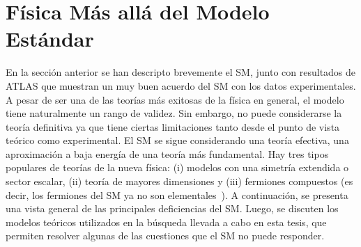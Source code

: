 \section{Física Más allá del Modelo Estándar}
\label{sec:theory:bsm}

En la sección anterior se han descripto brevemente el \ac{SM}, junto con resultados de \ac{ATLAS} que muestran un muy buen acuerdo del \ac{SM} con los datos experimentales. A pesar de ser una de las teorías más exitosas de la física en general, el modelo tiene naturalmente un rango de validez.
Sin embargo, no puede considerarse la teoría definitiva ya que tiene ciertas limitaciones tanto desde el punto de vista teórico como experimental. El \ac{SM} se sigue considerando una teoría efectiva, una aproximación a baja energía de una teoría más fundamental. Hay tres tipos populares de teorías de la nueva física: (i) modelos con una simetría extendida o sector escalar, (ii) teoría de mayores dimensiones y (iii) fermiones compuestos (es decir, los fermiones del \ac{SM} ya no son elementales~\cite{Kuhn_Zherwas-1984,Cabibbo_Maiani_Srivastava-1984,DeRújula_Maiani_Petronzio-1984,Baur_Spira_Zerwas-1990,Bhattacharya_Chauhan_Choudhary_Choudhury-2009,Zhan_Li_Liu_Li-2016}).
A continuación, se presenta una vista general de las principales deficiencias del \ac{SM}. Luego, se discuten los modelos teóricos utilizados en la búsqueda llevada a cabo en esta tesis, que permiten resolver algunas de las cuestiones que el \ac{SM} no puede responder.

